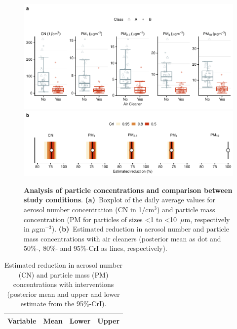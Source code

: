 \documentclass[fleqn,11pt]{wlscirep_supp}
\begin{document}
\begin{figure}[!htpb]
\centering
    \includegraphics[width=\linewidth]{../../results/env-data/particles-boxplot.pdf}
    \includegraphics[width=\linewidth]{../../results/env-data/estimation-results-figure.pdf}
    \caption[Analysis of particle concentrations and comparison between study conditions]{\textbf{Analysis of particle concentrations and comparison between study conditions}. \textbf{(a)}~Boxplot of the daily average values for aerosol number concentration (CN in 1/cm$^3$) and particle mass concentration (PM for particles of sizes <1 to <10~$\mu$m, respectively in $\mu$gm$^{-3}$). \textbf{(b)}~Estimated reduction in aerosol number and particle mass concentrations with air cleaners (posterior mean as dot and 50\%-, 80\%- and 95\%-CrI as lines, respectively). }
    \label{fig:palas-results}
\end{figure}

\begin{table}[!htpb]
    \caption[Estimated reduction in aerosol and particle concentrations with interventions]{Estimated reduction in aerosol number (CN) and particle mass (PM) concentrations with interventions (posterior mean and upper and lower estimate from the 95\%-CrI).}
    \label{tab:palas-est-results}
    \centering
    \footnotesize
    \begin{tabular}{l r r r}
    \toprule
    Variable & Mean & Lower & Upper \\
    \midrule
    
    \bottomrule
    \end{tabular}
\end{table}
\end{document}

